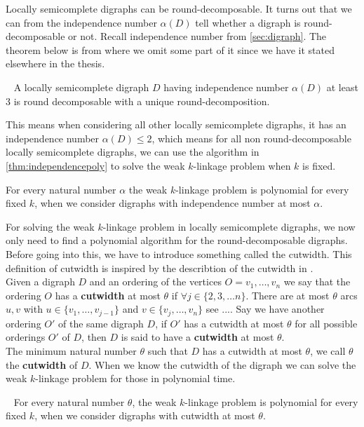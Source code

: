 Locally semicomplete digraphs can be round-decomposable. It turns out that we can from the independence number $\alpha (D)$ tell whether a digraph is round-decomposable or not.
Recall independence number from \autoref{sec:digraph}. 
The theorem below is from \cite{bangJGT77} where we omit some part of it since we have it stated elsewhere in the thesis.
\begin{thm}~\cite{bangJGT77}
    A locally semicomplete digraph $D$ having independence number $\alpha (D)$ at least 3 is round decomposable with a unique round-decomposition. 
    \label{thm:independenceround}
\end{thm} 
This means when considering all other locally semicomplete digraphs, it has an independence number $\alpha (D) \leq 2$, which means for all non round-decomposable locally semicomplete digraphs, we can use the algorithm in \autoref{thm:independencepoly} to solve the weak $k$-linkage problem when $k$ is fixed.
\begin{thm}
        For every natural number $\alpha$ the weak $k$-linkage problem is polynomial for every fixed $k$, when we consider digraphs with independence number at most $\alpha$.
    \label{thm:independencepoly} 
\end{thm}
For solving the weak $k$-linkage problem in locally semicomplete digraphs, we now only need to find a polynomial algorithm for the round-decomposable digraphs.
Before going into this, we have to introduce something called the cutwidth. This definition of cutwidth is inspired by the describtion of the cutwidth in \cite{bangJGT77}.\\
Given a digraph $D$ and an ordering of the vertices $O=v_1,\dots,v_n$ we say that the ordering $O$ has a \textbf{cutwidth} at most $\theta$ if $\forall j\in \lbrace 2,3, \dots n\rbrace$. There are at most $\theta$ arcs $u,v$ with $u\in \lbrace v_1,\dots ,v_{j-1}\rbrace$ and $v\in \lbrace v_j,\dots ,v_n\rbrace$ 
see ....
Say we have another ordering $O'$ of the same digraph $D$, if $O'$ has a cutwidth at most $\theta$ for all possible orderings $O'$ of $D$, then $D$ is said to have a \textbf{cutwidth} at most $\theta$. \\
The minimum natural number $\theta$ such that $D$ has a cutwidth at most $\theta$, we call $\theta$ the \textbf{cutwidth} of $D$.
When we know the cutwidth of the digraph we can solve the weak $k$-linkage problem for those in polynomial time.
\begin{thm}~\cite{bangJGT77}
    For every natural number $\theta$, the weak $k$-linkage problem is polynomial for every fixed $k$, when we consider digraphs with cutwidth at most $\theta$.
    \label{thm:cutwidthklink}
\end{thm}
